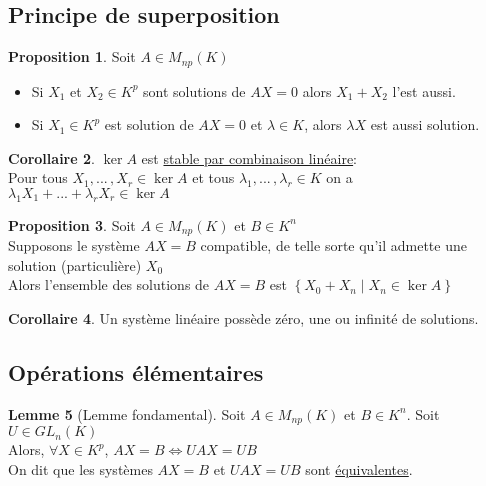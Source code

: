 \documentclass[10pt,a4paper]{article}
\theoremstyle{definition}
\newtheorem{proposition}{Proposition}[section]
\newtheorem{corollaire}[proposition]{Corollaire}
\newtheorem{lemme}[proposition]{Lemme}
\begin{document}
\subsection{Principe de superposition}
\begin{proposition}
Soit $A \in M_{np}(K)$
\begin{itemize}
\item Si $X_1$ et $X_2 \in K^p$ sont solutions de $AX = 0$ alors $X_1 + X_2$ l'est aussi.
\item Si $X_1 \in K^p$ est solution de $AX = 0$ et $\lambda \in K$, alors $\lambda X$ est aussi solution.
\end{itemize}
\end{proposition}
\begin{corollaire}
$\ker A$ est \uline{stable par combinaison linéaire}: \\
Pour tous $X_1, ...\,, X_r \in \ker A$ et tous $\lambda_1, ...\,, \lambda_r \in K$ on a $\lambda_1 X_1 + ... + \lambda_r X_r \in \ker A$
\end{corollaire}
\begin{proposition}
Soit $A \in M_{np}(K)$ et $B \in K^n$ \\
Supposons le système $AX = B$ compatible, de telle sorte qu'il admette une solution (particulière) $X_0$ \\
Alors l'ensemble des solutions de $AX = B$ est $\left\{ X_0 + X_n \mid X_n \in \ker A \right\}$
\end{proposition}
\begin{corollaire}
Un système linéaire possède zéro, une ou infinité de solutions.
\end{corollaire}

\subsection{Opérations élémentaires}
\begin{lemme}[Lemme fondamental]
Soit $A \in M_{np}(K)$ et $B \in K^n$. Soit $U \in GL_n(K)$ \\
Alors, $\forall X \in K^p$, $AX = B \iff UAX = UB$ \\
On dit que les systèmes $AX = B$ et $UAX = UB$ sont \uline{équivalentes}.
\end{lemme}
\end{document}
